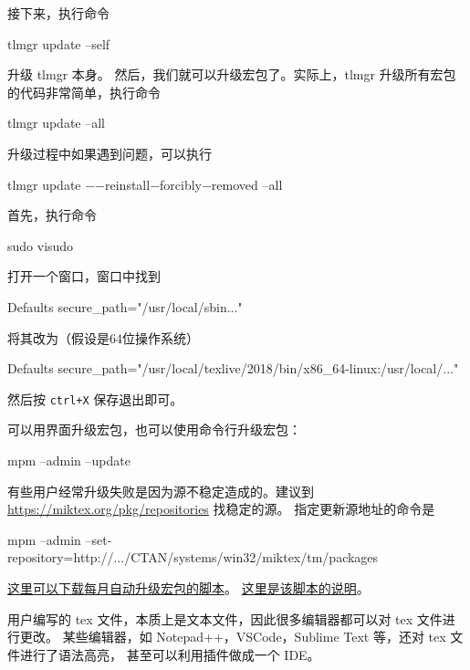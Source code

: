 接下来，执行命令
\begin{shcode}
  tlmgr update --self
\end{shcode}
升级 tlmgr 本身。 然后，我们就可以升级宏包了。实际上，tlmgr
升级所有宏包的代码非常简单，执行命令
\begin{shcode}
  tlmgr update --all
\end{shcode}
升级过程中如果遇到问题，可以执行
\begin{shcode}
  tlmgr update −−reinstall−forcibly−removed --all
\end{shcode}

首先，执行命令
\begin{shcode}
  sudo visudo
\end{shcode}
打开一个窗口，窗口中找到
\begin{shcode}
  Defaults secure_path="/usr/local/sbin..."
\end{shcode}
将其改为（假设是64位操作系统）
\begin{shcode}
  Defaults secure_path="/usr/local/texlive/2018/bin/x86_64-linux:/usr/local/..."
\end{shcode}
然后按 \verb|ctrl+X| 保存退出即可。


\MiKTeX{}
可以用界面升级宏包，也可以使用命令行升级宏包：
\begin{shcode}
  mpm --admin --update
\end{shcode}

有些用户经常升级失败是因为源不稳定造成的。建议到
\url{https://miktex.org/pkg/repositories} 找稳定的源。
指定更新源地址的命令是
\begin{shcode}
  mpm --admin --set-repository=http://.../CTAN/systems/win32/miktex/tm/packages
\end{shcode}


\href{http://pd10ibe5c.bkt.clouddn.com/TeXLive\%E5\%AE\%8F\%E5\%8C\%85\%E6\%AF\%8F\%E6\%9C\%88\%E8\%87\%AA\%E5\%8A\%A8\%E6\%9B\%B4\%E6\%96\%B0.zip}{这里可以下载每月自动升级\TeXLive{}宏包的脚本}。
\href{http://htharoldht.com/texlive-package-automatically-upgrades-every-month/}{这里是该脚本的说明}。



用户编写的 tex 文件，本质上是文本文件，因此很多编辑器都可以对 tex 文件进行更改。
某些编辑器，如 Notepad++，VSCode，Sublime Text 等，还对 tex 文件进行了语法高亮，
甚至可以利用插件做成一个 IDE。

